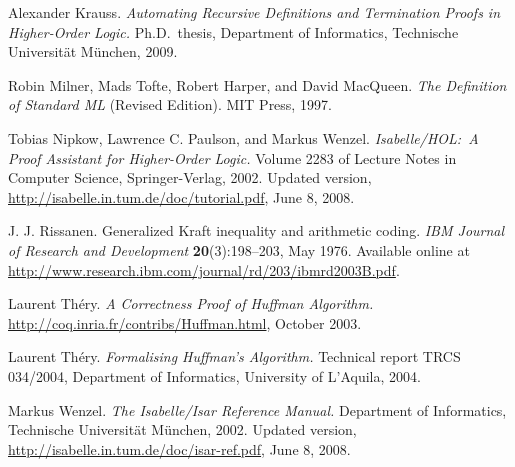 \documentclass[11pt,a4paper]{article}
\begin{document}
\begin{thebibliography}{[9]}
 Alexander Krauss. {\sl Automating Recursive Definitions
and Termination Proofs in Higher-Order Logic.} Ph.D.\ thesis, Department of
Informatics, Technische Universit\"at M\"unchen, 2009.

 Robin Milner, Mads Tofte, Robert Harper, and David
MacQueen. {\sl The Definition of Standard ML\/} (Revised Edition). MIT Press,
1997.

 Tobias Nipkow, Lawrence C. Paulson, and
Markus Wenzel. {\sl Is\-a\-belle/HOL:\ A Proof Assistant for
Higher-Order Logic.} Volume 2283 of Lecture Notes in Computer Science,
Springer-Verlag, 2002. Updated version,
\url{http://isabelle.in.tum.de/doc/tutorial.pdf}, June 8, 2008.

 J. J. Rissanen.
Generalized Kraft inequality and arithmetic coding. {\sl IBM
Journal of Research and Development\/} {\bf 20}(3):198--203, May 1976.
Available online at
\url{http://www.research.ibm.com/journal/rd/203/ibmrd2003B.pdf}.

 Laurent Th\'ery. {\sl A Correctness Proof of Huffman
Algorithm.} \url{http://coq.inria.fr/contribs/Huffman.html}, October 2003.

 Laurent Th\'ery. {\sl Formalising Huffman's Algorithm.}
Technical report TRCS 034/2004, Department of Informatics, University of
L'Aquila, 2004.

 Markus Wenzel. {\sl The Isabelle/Isar Reference Manual.}
Department of Informatics, Technische Universit\"at M\"unchen, 2002. Updated
version, \url{http://isabelle.in.tum.de/doc/isar-ref.pdf}, June 8, 2008.

\end{thebibliography}
\end{document}
